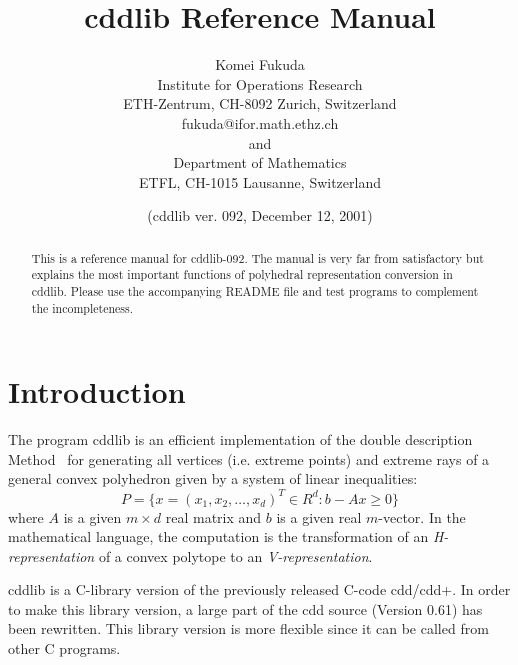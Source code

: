 \documentclass[11pt]{article}
\newcommand {\0} {{\bf 0}}
\begin{document}
\title{cddlib Reference Manual}
\author{Komei Fukuda \\
Institute for Operations Research\\
ETH-Zentrum, CH-8092 Zurich, Switzerland\\
fukuda@ifor.math.ethz.ch \\and\\
Department of Mathematics\\
ETFL, CH-1015 Lausanne, Switzerland}
\date{ (cddlib ver. 092,  December 12, 2001)}

\maketitle
\begin{abstract}
This is a reference manual for cddlib-092.  
The manual is very far from satisfactory
but explains the most important functions of polyhedral
representation conversion in cddlib.  
Please use the accompanying README file and test programs to complement the incompleteness.
\end{abstract}

\section{Introduction} \label{INTRODUCTION}

The program  cddlib  is an efficient implementation \cite{fp-ddmr-96}  of 
the double description Method~\cite{mrtt-ddm-53}
for generating  all vertices (i.e. extreme points)
and extreme rays of a general 
convex polyhedron given by 
a system of linear inequalities:
\[
   P = \{ x=(x_1, x_2, \ldots, x_d)^T \in R^{d}:  b - A  x  \ge 0 \}
\]
where $A$ is a given $m \times d$ real matrix and 
$b$ is a given real $m$-vector.   In the mathematical
language, the computation is the transformation
of an {\em H-representation\/} of a convex polytope
to an {\em V-representation}.  

cddlib is a C-library version of the previously released C-code cdd/cdd+.
In order to make this library version, a large part of the cdd source
(Version 0.61) has been rewritten.
This library version is more flexible since it can be called from other
C programs.
\end{document}
